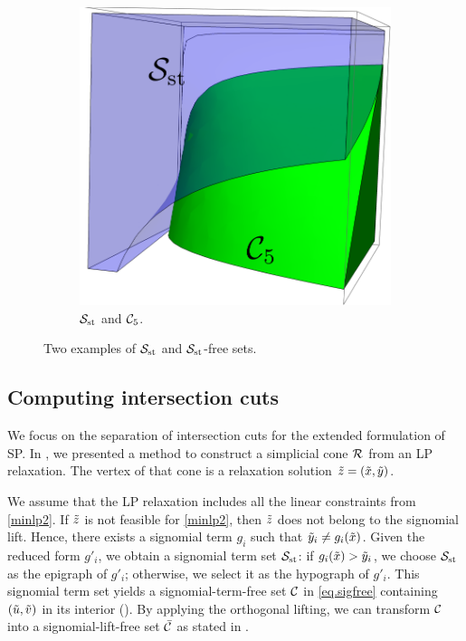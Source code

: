 \begin{figure}[!ht]
\begin{subfigure}[b]{0.35\textwidth}
     	\includegraphics[width=\textwidth]{Chaptersig/media/sfree2.pdf}
     	\caption{$\mathcal S_{\mathrm{st}}$ and $\mathcal C_5$.}
    	\label{fig.free2}
 \end{subfigure}
  \caption{Two examples of $\mathcal S_{\mathrm{st}}$ and $\mathcal S_{\mathrm{st}}$-free sets.}
  \label{fig.free}
\end{figure}

 

\subsection{Computing intersection cuts}
\label{sec.sepic}
We focus on the separation of intersection cuts for the extended formulation of SP. In , we presented a method to construct a simplicial cone $\mathcal R$ from an LP relaxation. The vertex of that cone is  a relaxation solution $\tilde{z} = (\tilde{x}, \tilde{y})$.

We assume that the LP relaxation includes all the linear constraints from \eqref{minlp2}. If $\tilde{z}$ is not feasible for  \eqref{minlp2}, then $\tilde{z}$ does not belong to the signomial lift. Hence, there exists a signomial term $g_i$ such that $\tilde{y}_i \neq g_i(\tilde{x})$. Given the reduced form $g'_i$,  we obtain a signomial term set $\mathcal S_{\mathrm{st}}$: if $g_i(\tilde{x}) > \tilde{y}_i$, we choose $\mathcal S_{\mathrm{st}}$ as the epigraph of $g'_i$; otherwise, we select it as the hypograph of $g'_i$.  This signomial term set yields a signomial-term-free set $\mathcal C$ in \eqref{eq.sigfree} containing  $(\tilde{u},\tilde{v})$  in its interior ().  By applying the orthogonal lifting, we can transform $\mathcal C$ into a signomial-lift-free set $\bar{\mathcal C}$ as stated in  .

